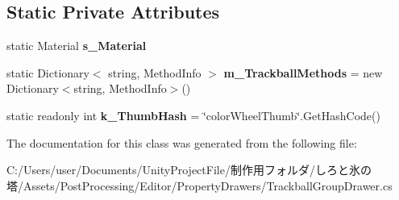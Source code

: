 \subsection*{Static Private Attributes}
\begin{DoxyCompactItemize}
\item 
\mbox{\label{class_unity_editor_1_1_post_processing_1_1_trackball_group_drawer_a63a310b81cb4ce686055ba578979cde1}} 
static Material {\bfseries s\+\_\+\+Material}
\item 
\mbox{\label{class_unity_editor_1_1_post_processing_1_1_trackball_group_drawer_aa452c61074628fe1d84a8c34bf730019}} 
static Dictionary$<$ string, Method\+Info $>$ {\bfseries m\+\_\+\+Trackball\+Methods} = new Dictionary$<$string, Method\+Info$>$()
\item 
\mbox{\label{class_unity_editor_1_1_post_processing_1_1_trackball_group_drawer_aeb5fd1772425fa374a9c7f63cc6a5105}} 
static readonly int {\bfseries k\+\_\+\+Thumb\+Hash} = \char`\"{}color\+Wheel\+Thumb\char`\"{}.Get\+Hash\+Code()
\end{DoxyCompactItemize}


The documentation for this class was generated from the following file\+:\begin{DoxyCompactItemize}
\item 
C\+:/\+Users/user/\+Documents/\+Unity\+Project\+File/制作用フォルダ/しろと氷の塔/\+Assets/\+Post\+Processing/\+Editor/\+Property\+Drawers/Trackball\+Group\+Drawer.\+cs\end{DoxyCompactItemize}
